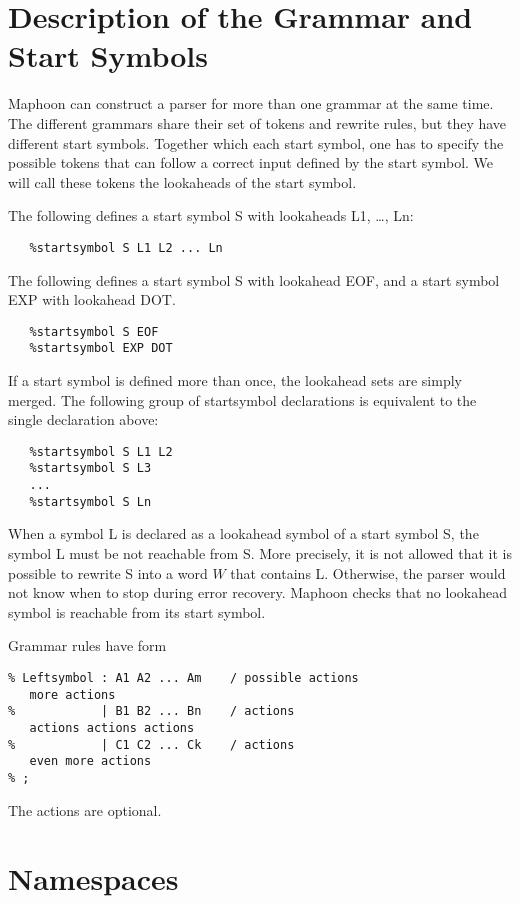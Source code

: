 \documentclass{article}
\begin{document}
\section{Description of the Grammar and Start Symbols}

Maphoon can construct a parser for more than one grammar at the
same time. The different grammars share their set of tokens and 
rewrite rules, but they have different start symbols. 
Together which each start symbol, one has to specify the 
possible tokens that can follow a correct input defined by the
start symbol. We will call these tokens
the lookaheads of the start symbol.

\noindent
The following defines a start symbol S with lookaheads
L1, \ldots, Ln:
\begin{verbatim}
   %startsymbol S L1 L2 ... Ln  
\end{verbatim}
The following defines a start symbol S with lookahead
EOF, and a start symbol EXP with lookahead DOT.
\begin{verbatim}
   %startsymbol S EOF
   %startsymbol EXP DOT
\end{verbatim}
If a start symbol is defined more than once, the lookahead
sets are simply merged. The following group of startsymbol declarations
is equivalent to the single declaration above:

\begin{verbatim}
   %startsymbol S L1 L2 
   %startsymbol S L3 
   ...
   %startsymbol S Ln 
\end{verbatim}

\noindent
When a symbol L is declared as a lookahead symbol of a start
symbol S, the symbol L must be not reachable from S. 
More precisely, it is not allowed that it is possible to rewrite
S into a word $ W $ that contains L. 
Otherwise, the parser would not know when to stop during error
recovery. 
Maphoon checks that no lookahead symbol is reachable from its
start symbol. 

\noindent
Grammar rules have form
\begin{verbatim}
% Leftsymbol : A1 A2 ... Am    / possible actions
   more actions 
%            | B1 B2 ... Bn    / actions
   actions actions actions
%            | C1 C2 ... Ck    / actions
   even more actions 
% ;

\end{verbatim}

\noindent
The actions are optional. 

\section{Namespaces}
\label{Sect_namespace}
\end{document}
